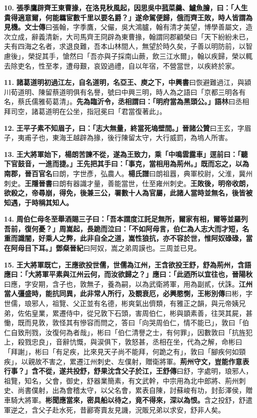\textbf{10.} \textbf{張季鷹辟齊王東曹掾，在洛見秋風起，因思吳中菰菜羹、鱸魚膾，曰：「人生貴得適意爾，何能羈宦數千里以要名爵？」遂命駕便歸，俄而齊王敗，時人皆謂為見機。}{\footnotesize \textbf{文士傳}曰張翰，字季鷹，父儼，吳大鴻臚，翰有清才美望，博學善屬文，造次立成，辭義清新，大司馬齊王冏辟為東曹掾，翰謂同郡顧榮曰「天下紛紛未已，夫有四海之名者，求退良難，吾本山林間人，無望於時久矣，子善以明防前，以智慮後」，榮捉其手，愴然曰「吾亦與子採南山蕨，飲三江水爾」，翰以疾歸，榮以輒去除吏名，性至孝，遭母艱，哀毀過禮，自以年宿，不營當世，以疾終於家。}

\textbf{11.} \textbf{諸葛道明初過江左，自名道明，名亞王、庾之下，}{\footnotesize \textbf{中興書}曰恢避難過江，與潁川荀道明、陳留蔡道明俱有名譽，號曰中興三明，時人為之語曰「京都三明各有名，蔡氏儒雅荀葛清」。}\textbf{先為臨沂令，丞相謂曰：「明府當為黑頭公。」}{\footnotesize \textbf{語林}曰丞相拜司空，諸葛道明在公坐，指冠冕曰「君當復著此」。}

\textbf{12.} \textbf{王平子素不知眉子，曰：「志大無量，終當死塢壁間。」}{\footnotesize \textbf{晉諸公贊}曰王玄，字眉子，夷甫子也，東海王越辟為掾，後行陳留太守，大行威罰，為塢人所害。}

\textbf{13.} \textbf{王大將軍始下，楊朗苦諫不從，遂為王致力，乘「中鳴雲露車」逕前曰：「聽下官鼓音，一進而捷。」王先把其手曰：「事克，當相用為荊州。」既而忘之，以為南郡，}{\footnotesize \textbf{晉百官名}曰朗，字世彥，弘農人。\textbf{楊氏譜}曰朗祖囂，典軍校尉，父淮，冀州刺史。\textbf{王隱晉書}曰朗有器識才量，善能當世，仕至雍州刺史。}\textbf{王敗後，明帝收朗，欲殺之，帝尋崩，得免，後兼三公，署數十人為官屬，此諸人當時並無名，後皆被知遇，于時稱其知人。}

\textbf{14.} \textbf{周伯仁母冬至舉酒賜三子曰：「吾本謂度江託足無所，爾家有相，爾等並羅列吾前，復何憂？」周嵩起，長跪而泣曰：「不如阿母言，伯仁為人志大而才短，名重而識闇，好乘人之弊，此非自全之道，嵩性狼抗，亦不容於世，惟阿奴碌碌，當在阿母目下耳。」}{\footnotesize \textbf{鄧粲晉紀}曰阿奴，嵩之弟周謨也。三周並已見。}

\textbf{15.} \textbf{王大將軍既亡，王應欲投世儒，世儒為江州，王含欲投王舒，舒為荊州，含語應曰：「大將軍平素與江州云何，而汝欲歸之？」應曰：「此迺所以宜往也，}{\footnotesize \textbf{晉陽秋}曰應，字安期，含子也，敦無子，養為嗣，以為武衛將軍，用為副貳，伏誅。}\textbf{江州當人彊盛時，能抗同異，此非常人所行，及覩衰厄，必興愍惻，}{\footnotesize \textbf{王彬別傳}曰彬，字世儒，琅邪人，祖覽、父正並有名德，彬爽氣出儕類，有雅正之韻，與元帝姨兄弟，佐佑皇業，累遷侍中，從兄敦下石頭，害周伯仁，彬與顗素善，往哭其屍，甚慟，既而見敦，敦怪其有慘容而問之，答曰「向哭周伯仁，情不能已」，敦曰「伯仁自致刑戮，汝復何為者哉」，彬曰「伯仁清譽之士，有何罪」，因數敦曰「抗旌犯上，殺戮忠良」，音辭忼慨，與涙俱下，敦怒甚，丞相在坐，代為之解，命彬曰「拜謝」，彬曰「有足疾，比來見天子尚不能拜，何跪之有」，敦曰「腳疾何如頸疾」，以親故不害之，累遷江州刺史、左僕射，贈衛將軍。}\textbf{荊州守文，豈能作意表行事？」含不從，遂共投舒，舒果沈含父子於江，}{\footnotesize \textbf{王舒傳}曰舒，字處明，琅邪人，祖覽，知名，父會，御史，舒器業簡素，有文武幹，中宗用為北中郎將、荊州刺史、尚書僕射，出為會稽太守，以父名會，累表自陳，討蘇峻有功，封彭澤侯，贈車騎大將軍。}\textbf{彬聞應當來，密具船以待之，竟不得來，深以為恨。}{\footnotesize 含之投舒，舒遣軍逆之，含父子赴水死，昔酈寄賣友見譏，況販兄弟以求安，舒非人矣。}

